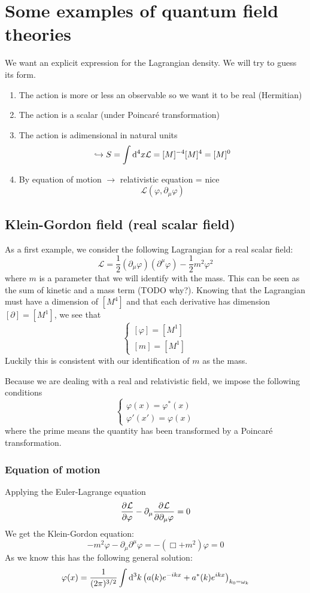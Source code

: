 \chapter{Some examples of quantum field theories}
We want an explicit expression for the Lagrangian density. We will try to guess its form.
\begin{enumerate}
\item The action is more or less an observable so we want it to be real (Hermitian)
\item The action is a scalar (under Poincaré transformation)
\item The action is adimensional in natural units
\[ \hookrightarrow S = \int \operatorname{d \!}{^4x}\mathcal{L} = [M]^{-4}[M]^4 = [M]^0 \]
\item By equation of motion $\to$ relativistic equation = nice
\[ \mathcal{L}(\varphi, \partial_\mu\varphi) \]
\end{enumerate}


\section{Klein-Gordon field (real scalar field)}


As a first example, we consider the following Lagrangian for a real scalar field:
\[ \mathcal{L} = \frac{1}{2}(\partial_\mu\varphi)(\partial^\mu\varphi) - \frac{1}{2}m^2\varphi^2 \]
where $m$ is a parameter that we will identify with the mass.
This can be seen as the sum of kinetic and a mass term (TODO why?). Knowing that the Lagrangian must have a dimension of $[M^4]$ and that each derivative has dimension $[\partial] = [M^1]$, we see that
\[ \begin{cases}
[\varphi] = [M^1] \\
[m] = [M^1]
\end{cases} \]
Luckily this is consistent with our identification of $m$ as the mass.

Because we are dealing with a real and relativistic field, we impose the following conditions
\[ \begin{cases}
\varphi(x) = \varphi^*(x) \\
\varphi'(x') = \varphi(x)
\end{cases} \]
where the prime means the quantity has been transformed by a Poincaré transformation.

\subsection{Equation of motion}
Applying the Euler-Lagrange equation
\[  \frac{\partial{^{}}\mathcal{L}}{\partial{{\varphi}^{}}}  - \partial_\mu  \frac{\partial{^{}}\mathcal{L}}{\partial{{\partial_\mu\varphi}^{}}}  = 0 \]
We get the Klein-Gordon equation:
\[ -m^2\varphi - \partial_\mu\partial^\mu\varphi = -(\Box+m^2)\varphi = 0\]
As we know this has the following general solution:
\[ \varphi(x) = \frac{1}{(2\pi)^{3/2}}\int \operatorname{d \!}{^3k}\left(a(k)e^{-ikx} + a^*(k)e^{ikx}\right)_{k_0 = \omega_k} \]

